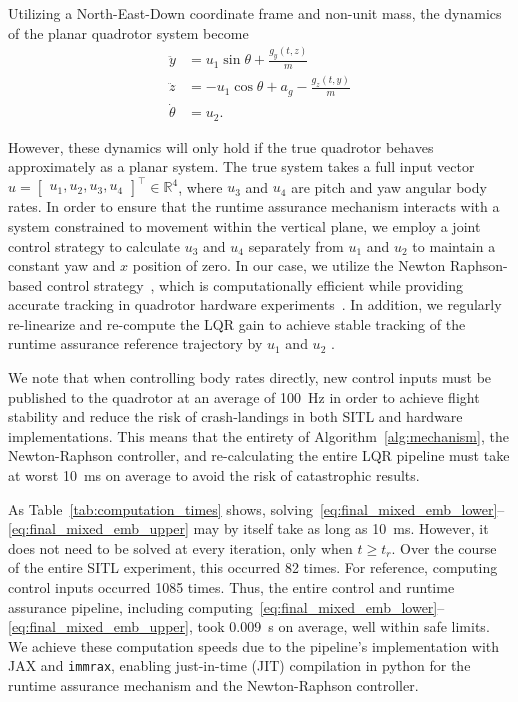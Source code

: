 \documentclass{IEEEojcsys}
\begin{document}
Utilizing a North-East-Down coordinate frame and non-unit mass, the dynamics of the planar quadrotor system become
\begin{equation}
  \label{eq:planarquad_hardware}
  \begin{split}
  \ddot{y}&=u_1\sin \theta + \frac{g_y(t, z)}{m}\\
  \ddot{z}&=-u_1\cos \theta + a_g - \frac{g_z(t,y)}{m}\\
  \dot{\theta}&=u_2.
  \end{split}
\end{equation}

However, these dynamics will only hold if the true quadrotor behaves approximately as a planar system. The true system takes a full input vector \(u = \begin{bmatrix}u_1, u_2, u_3, u_4\end{bmatrix}^\top \in \mathbb{R}^4\), where \(u_3\) and \(u_4\) are pitch and yaw angular body rates. In order to ensure that the runtime assurance mechanism interacts with a system constrained to movement within the vertical plane, we employ a joint control strategy to calculate \(u_3\) and \(u_4\) separately from \(u_1\) and \(u_2\) to maintain a constant yaw and \(x\) position of zero. In our case, we utilize the Newton Raphson-based control strategy~\cite{Wardi-NR}, which is computationally efficient while providing accurate tracking in quadrotor hardware experiments~\cite{Evanns-NR}. In addition, we regularly re-linearize and re-compute the LQR gain to achieve stable tracking of the runtime assurance reference trajectory by \(u_1\) and \(u_2\) .

We note that when controlling body rates directly, new control inputs must be published to the quadrotor at an average of \qty{100}{Hz} in order to achieve flight stability and reduce the risk of crash-landings in both SITL and hardware implementations. This means that the entirety of Algorithm~\ref{alg:mechanism}, the Newton-Raphson controller, and re-calculating the entire LQR pipeline must take at worst \qty{10}{ms} on average to avoid the risk of catastrophic results.

As Table~\ref{tab:computation_times} shows, solving~\eqref{eq:final_mixed_emb_lower}--\eqref{eq:final_mixed_emb_upper} may by itself take as long as \qty{10}{ms}. However, it does not need to be solved at every iteration, only when \(t \geq t_r\). Over the course of the entire SITL experiment, this occurred 82 times. For reference, computing control inputs occurred 1085 times. Thus, the entire control and runtime assurance pipeline, including computing~\eqref{eq:final_mixed_emb_lower}--\eqref{eq:final_mixed_emb_upper}, took \qty{.009}{s} on average, well within safe limits. We achieve these computation speeds due to the pipeline's implementation with JAX and \texttt{immrax}, enabling just-in-time (JIT) compilation in python for the runtime assurance mechanism and the Newton-Raphson controller.
\end{document}
